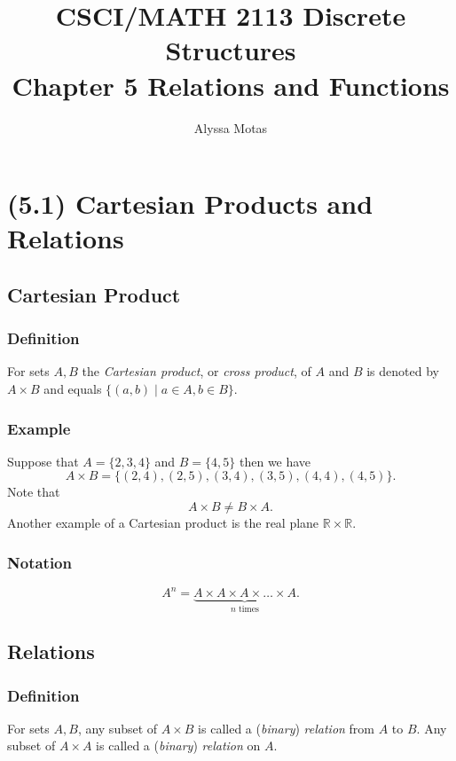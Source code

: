 \documentclass[11pt]{article}
\title{\textbf{CSCI/MATH 2113 Discrete Structures} \\ Chapter 5 Relations and Functions}
\author{Alyssa Motas}
\begin{document}
    \maketitle

    \pagebreak

    \tableofcontents

    \pagebreak

    \section{(5.1) Cartesian Products and Relations}

        \subsection{Cartesian Product}

        \subsubsection{Definition}
        For sets $A, B$ the \emph{Cartesian product}, or \emph{cross product}, of $A$ and $B$ is denoted by \(A \times B\) and equals \(\{(a,b) \mid a \in A, b \in B\}.\)

        \subsubsection{Example}
        Suppose that \(A = \{2,3,4\}\) and \(B = \{4,5\}\) then we have \[A \times B = \{(2,4),(2,5),(3,4),(3,5),(4,4),(4,5)\}.\] Note that \[A \times B \neq B \times A.\] Another example of a Cartesian product is the real plane \(\mathbb{R} \times \mathbb{R}\).

        \subsubsection{Notation}
        \[A^n = \underbrace{A \times A \times A \times \dots \times A}_\text{$n$ times}.\]

        \subsection{Relations}

        \subsubsection{Definition}
        For sets $A, B$, any subset of \(A \times B\) is called a (\emph{binary}) \emph{relation} from $A$ to $B$. Any subset of \(A \times A\) is called a (\emph{binary}) \emph{relation} on $A$.
\end{document}
